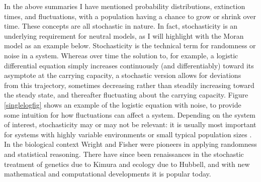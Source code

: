 In the above summaries I have mentioned probability distributions, extinction times, and fluctuations, with a population having a chance to grow or shrink over time. 
These concepts are all stochastic in nature. 
In fact, stochasticity is an underlying requirement for neutral models, as I will highlight with the Moran model as an example below. 
Stochasticity is the technical term for randomness or noise in a system. %
Whereas over time the solution to, for example, a logistic differential equation simply increases continuously (and differentiably) toward its asymptote at the carrying capacity, a stochastic version allows for deviations from this trajectory, sometimes decreasing rather than steadily increasing toward the steady state, and thereafter fluctuating about the carrying capacity. 
Figure \ref{singlelogfig} shows an example of the logistic equation with noise, to provide some intuition for how fluctuations can affect a system. 
Depending on the system of interest, stochasticity may or may not be relevant: it is usually most important for systems with highly variable environments or small typical population sizes \cite{Nisbet1982,Kimura1983,VanKampen1992,Gardiner2004,Blythe2007,Ovaskainen2010,Black2012}. 
In the biological context Wright and Fisher were pioneers in applying randomness and statistical reasoning. %
There have since been renaissances in the stochastic treatment of genetics due to Kimura and ecology due to Hubbell, and with new mathematical and computational developments it is popular today. %

